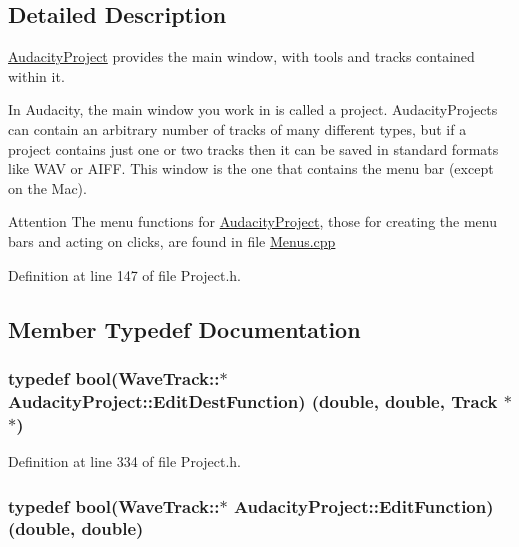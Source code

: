 \subsection{Detailed Description}
\hyperlink{class_audacity_project}{Audacity\+Project} provides the main window, with tools and tracks contained within it. 

In Audacity, the main window you work in is called a project. Audacity\+Projects can contain an arbitrary number of tracks of many different types, but if a project contains just one or two tracks then it can be saved in standard formats like W\+AV or A\+I\+FF. This window is the one that contains the menu bar (except on the Mac).

\begin{DoxyAttention}{Attention}
The menu functions for \hyperlink{class_audacity_project}{Audacity\+Project}, those for creating the menu bars and acting on clicks, are found in file \hyperlink{_menus_8cpp}{Menus.\+cpp} 
\end{DoxyAttention}


Definition at line 147 of file Project.\+h.



\subsection{Member Typedef Documentation}
\subsubsection[{\texorpdfstring{Edit\+Dest\+Function}{EditDestFunction}}]{\setlength{\rightskip}{0pt plus 5cm}typedef {\bf bool}(Wave\+Track\+::$\ast$  Audacity\+Project\+::\+Edit\+Dest\+Function) (double, double, {\bf Track} $\ast$$\ast$)}\hypertarget{class_audacity_project_aeae383dd831845935d1444a09e3fddfb}{}\label{class_audacity_project_aeae383dd831845935d1444a09e3fddfb}


Definition at line 334 of file Project.\+h.

\subsubsection[{\texorpdfstring{Edit\+Function}{EditFunction}}]{\setlength{\rightskip}{0pt plus 5cm}typedef {\bf bool}(Wave\+Track\+::$\ast$  Audacity\+Project\+::\+Edit\+Function) (double, double)}\hypertarget{class_audacity_project_a839fd1fb973fd78cdc01bd13d5b72106}{}\label{class_audacity_project_a839fd1fb973fd78cdc01bd13d5b72106}



